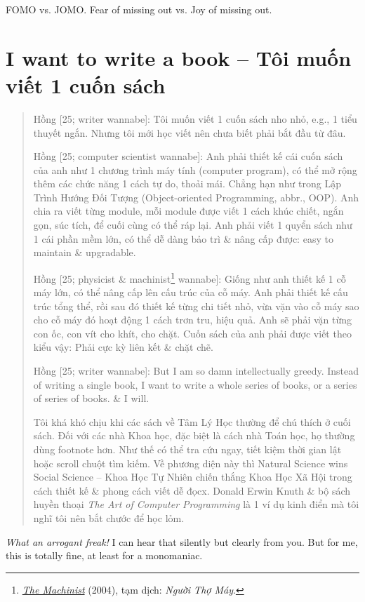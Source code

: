 \documentclass[12pt,twoside]{book}
\begin{document}
FOMO vs. JOMO. Fear of missing out vs. Joy of missing out.

\section{I want to write a book -- Tôi muốn viết 1 cuốn sách}

\begin{quote}
	{\sf Hồng [25; writer wannabe]}: Tôi muốn viết 1 cuốn sách nho nhỏ, e.g., 1 tiểu thuyết ngắn. Nhưng tôi mới học viết nên chưa biết phải bắt đầu từ đâu.
	
	{\sf Hồng [25; computer scientist wannabe]}: Anh phải thiết kế cái cuốn sách của anh như 1 chương trình máy tính (computer program), có thể mở rộng thêm các chức năng 1 cách tự do, thoải mái. Chẳng hạn như trong Lập Trình Hướng Đối Tượng (Object-oriented Programming, abbr., OOP). Anh chia ra viết từng module, mỗi module được viết 1 cách khúc chiết, ngắn gọn, súc tích, để cuối cùng có thể ráp lại. Anh phải viết 1 quyển sách như 1 cái phần mềm lớn, có thể dễ dàng bảo trì \& nâng cấp được: easy to maintain \& upgradable.
	
	{\sf Hồng [25; physicist \& machinist\footnote{\href{https://www.imdb.com/title/tt0361862/}{\it The Machinist} (2004), tạm dịch: {\it Người Thợ Máy}.} wannabe]}: Giống như anh thiết kế 1 cỗ máy lớn, có thể nâng cấp lên cấu trúc của cỗ máy. Anh phải thiết kế cấu trúc tổng thể, rồi sau đó thiết kế từng chi tiết nhỏ, vừa vặn vào cỗ máy sao cho cỗ máy đó hoạt động 1 cách trơn tru, hiệu quả. Anh sẽ phải vặn từng con ốc, con vít cho khít, cho chặt. Cuốn sách của anh phải được viết theo kiểu vậy: Phải cực kỳ liên kết \& chặt chẽ.
	
	{\sf Hồng [25; writer wannabe]}: But I am so damn intellectually greedy. Instead of writing a single book, I want to write a whole series of books, or a series of series of books. \& I will.
	
	Tôi khá khó chịu khi các sách về Tâm Lý Học thường để chú thích ở cuối sách. Đối với các nhà Khoa học, đặc biệt là cách nhà Toán học, họ thường dùng footnote hơn. Như thế có thể tra cứu ngay, tiết kiệm thời gian lật hoặc scroll chuột tìm kiếm. Về phương diện này thì Natural Science wins Social Science -- Khoa Học Tự Nhiên chiến thắng Khoa Học Xã Hội trong cách thiết kế \& phong cách viết dễ đọcx. {\sc Donald Erwin Knuth} \& bộ sách huyền thoại {\it The Art of Computer Programming} \cite{Knuth1997,Knuth1998} là 1 ví dụ kinh điển mà tôi nghĩ tôi nên bắt chước để học lỏm.
\end{quote}
{\it What an arrogant freak!} I can hear that silently but clearly from you. But for me, this is totally fine, at least for a monomaniac.
\end{document}

